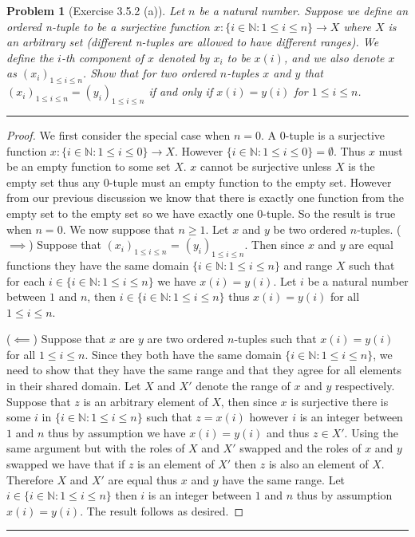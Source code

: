 \documentclass{article}
\newcommand{\lined}{\noindent\rule{\textwidth}{1pt}}
\newtheorem*{problem}{Problem}
\begin{document}
	\begin{problem}[Exercise 3.5.2 (a)]
		Let $n$ be a natural number. Suppose we define an ordered n-tuple to be a surjective function $x:\{i \in \mathbb{N}:1 \leq i \leq n\} \rightarrow X$ where $X$ is an arbitrary set (different n-tuples are allowed to have different ranges). We define the $i$-th component of $x$ denoted by $x_i$ to be $x(i)$, and we also denote $x$ as $(x_i)_{1 \leq i \leq n}$. Show that for two ordered $n$-tuples $x$ and $y$ that $(x_i)_{1 \leq i \leq n} = (y_i)_{1 \leq i \leq n}$ if and only if $x(i) = y(i)$ for $1 \leq i \leq n$.
	\end{problem}
	
	\lined
	\begin{proof}
		We first consider the special case when $n = 0$. A $0$-tuple is a surjective function $x:\{i \in \mathbb{N}:1 \leq i \leq 0\} 
		\rightarrow X$. However $\{i \in \mathbb{N}:1 \leq i \leq 0\} = \emptyset$. Thus $x$ must be an empty function to some set $X$.
		$x$ cannot be surjective unless $X$ is the empty set thus any $0$-tuple must an empty function to the empty set. However from our previous discussion we know that there is exactly one function from the empty set to the empty set so we have exactly
		one $0$-tuple. So the result is true when $n = 0$. We now suppose that $n \geq 1$. Let $x$ and $y$ be two ordered $n$-tuples. ($\implies$) Suppose that $(x_i)_{1 \leq i \leq n}$ = $(y_i)_{1 \leq i \leq n}$. Then since $x$ and $y$ are equal functions they have the same domain $\{i \in \mathbb{N}:1\leq i \leq n\}$ and range $X$ such that for each $i \in \{i \in \mathbb{N}:1 \leq i \leq n\}$ we have $x(i) = y(i)$. Let $i$ be a natural number between $1$ and $n$, then $i \in \{i \in \mathbb{N}:1 \leq i \leq n\}$  thus $x(i) = y(i)$ for all $1 \leq i \leq n$.
		\linebreak
		
		\noindent ($\impliedby$) Suppose that $x$ are $y$ are two ordered $n$-tuples such that $x(i) = y(i)$ for all $1 \leq i \leq n$. Since they both have the same domain $\{i \in \mathbb{N}:1 \leq i \leq n\}$, we need to show that they have the same range and that they agree for all elements in their shared domain. Let $X$ and $X'$ denote the range of $x$ and $y$ respectively. Suppose that $z$ is an arbitrary element of $X$, then since $x$ is surjective there is some $i$ in $\{i \in \mathbb{N}:1 \leq i \leq n\}$
		such that $z = x(i)$ however $i$ is an integer between $1$ and $n$ thus by assumption we have $x(i) = y(i)$ and thus $z \in X'$.
		Using the same argument but with the roles of $X$ and $X'$ swapped and the roles of $x$ and $y$ swapped we have that if $z$ is an element of $X'$ then $z$ is also an element of $X$. Therefore $X$ and $X'$ are equal thus $x$ and $y$ have the same range. Let $i \in \{i \in \mathbb{N}:1 \leq i \leq n\}$ then $i$ is an integer between $1$ and $n$ thus by assumption $x(i) = y(i)$. The result follows as desired.
	\end{proof}
	\lined
	
\end{document}
